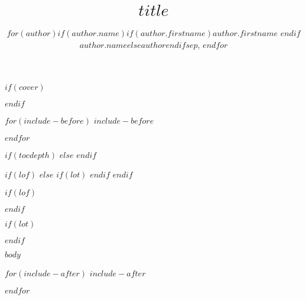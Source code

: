 \documentclass[twoside]{extreport}
\title{$title$}
\author{
$for(author)$$if(author.name)$$if(author.firstname)$$author.firstname$ $endif$$author.name$$else$$author$$endif$$sep$, $endfor$
}
\begin{document}
$if(cover)$

$endif$
\maketitle
{}

$for(include-before)$
$include-before$

$endfor$


\clearpage

{}
$if(tocdepth)$
\setcounter{tocdepth}{$tocdepth$}
$else$
\setcounter{tocdepth}{3}
$endif$
\tableofcontents

$if(lof)$
\clearpage
$else$
  $if(lot)$
\clearpage
  $endif$
$endif$

$if(lof)$
{}
\listoffigures
\vspace{34pt}
$endif$

$if(lot)$
{}
\listoftables
$endif$

\clearpage


$body$

$for(include-after)$
$include-after$

$endfor$
\end{document}
